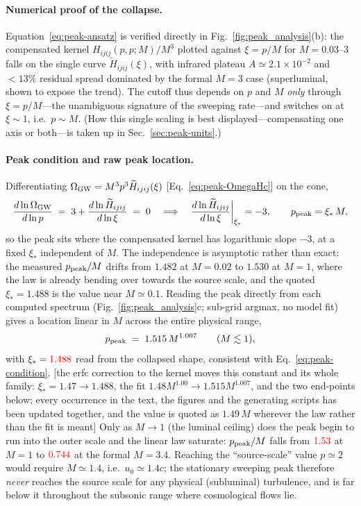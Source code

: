 \documentclass[10pt,prd,aps,nobibnotes,superscriptaddress,preprintnumbers,notitlepage]{revtex4-1}
\newcommand{\add}[1]{{\color{red}#1}}
\newcommand{\why}[1]{{\color{red}\footnotesize\textsf{[#1]}}}
\newcommand{\add}[1]{#1}
\newcommand{\why}[1]{}
\begin{document}
\paragraph{Numerical proof of the collapse.}
Equation~\eqref{eq:peak-ansatz} is verified directly in
Fig.~\ref{fig:peak_analysis}(b): the compensated kernel $H_{ijij}(p,p;M)/M^3$
plotted against $\xi=p/M$ for $M=0.03$--$3$ falls on the single curve
$\widetilde H_{ijij}(\xi)$, with infrared plateau $A\simeq2.1\times10^{-2}$ and
$<13\%$ residual spread dominated by the formal $M=3$ case (superluminal, shown
to expose the trend). The cutoff thus
depends on $p$ and $M$ \emph{only} through $\xi=p/M$---the unambiguous signature of
the sweeping rate---and switches on at $\xi\sim1$, i.e.\ $p\sim M$. (How this
single scaling is best displayed---compensating one axis or both---is taken up in
Sec.~\ref{sec:peak-units}.)

\paragraph{Peak condition and raw peak location.}
Differentiating $\Omega_{\rm GW}=M^{3}p^{3}\widetilde H_{ijij}(\xi)$
[Eq.~\eqref{eq:peak-OmegaHc}] on the cone,
\begin{equation}
  \frac{d\ln\Omega_{\rm GW}}{d\ln p}\;=\;3+\frac{d\ln\widetilde H_{ijij}}{d\ln\xi}\;=\;0
  \quad\Longrightarrow\quad
  \frac{d\ln\widetilde H_{ijij}}{d\ln\xi}\bigg|_{\xi_\ast}=-3,\qquad p_{\rm peak}=\xi_\ast\,M,
  \label{eq:peak-condition}
\end{equation}
so the peak sits where the compensated kernel has logarithmic slope $-3$, at a fixed
$\xi_\ast$ independent of $M$. \add{The independence is asymptotic rather than exact:
the measured $p_{\rm peak}/M$ drifts from $1.482$ at $M=0.02$ to $1.530$ at $M=1$, where
the law is already bending over towards the source scale, and the quoted
$\xi_\ast=1.488$ is the value near $M\simeq0.1$.} Reading the peak directly from each computed
spectrum (Fig.~\ref{fig:peak_analysis}c; sub-grid argmax, no model fit) gives a
location linear in $M$ across the entire physical range,
\begin{equation}
  p_{\rm peak}\;=\;1.515\,M^{1.007}\qquad(M\lesssim1),
  \label{eq:peak-fit}
\end{equation}
with $\xi_\ast=\add{1.488}$ read from the collapsed shape, consistent with
Eq.~\eqref{eq:peak-condition}.
\why{the erfc correction to the kernel moves this constant and its whole family:
$\xi_\ast=1.47\to1.488$, the fit $1.48M^{1.00}\to1.515M^{1.007}$, and the two
end-points below; every occurrence in the text, the figures and the generating
scripts has been updated together, and the value is quoted as $1.49\,M$ wherever
the law rather than the fit is meant}
Only as $M\to1$ (the luminal ceiling) does the peak
begin to run into the outer scale and the linear law saturate: $p_{\rm peak}/M$
falls from $\add{1.53}$ at $M=1$ to $\add{0.744}$ at the formal $M=3.4$. Reaching the
``source-scale'' value $p\simeq2$ would require $M\simeq1.4$, i.e.\ $u_0\simeq1.4c$;
the stationary sweeping peak therefore \emph{never} reaches the source scale for
any physical (subluminal) turbulence, and is far below it throughout the subsonic
range where cosmological flows lie.
\end{document}
